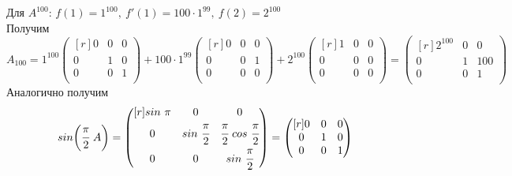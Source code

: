 \documentclass[12pt]{article}
\theoremstyle{definition}
\numberwithin{equation}{section}
\begin{document}
Для $A^{100}$: $f(1)=1^{100},~f'(1)=100\cdot 1^{99},~f(2)=2^{100}$\\
Получим
\[A_{100}=1^{100}\begin{pmatrix}[r]
0 & 0 & 0 \\
0 & 1 & 0 \\
0 & 0 & 1 \\
\end{pmatrix} + 100\cdot 1^{99}\begin{pmatrix}[r]
0 & 0 & 0 \\
0 & 0 & 1 \\
0 & 0 & 0 \\
\end{pmatrix} + 2^{100}\begin{pmatrix}[r]
1 & 0 & 0 \\
0 & 0 & 0 \\
0 & 0 & 0 \\
\end{pmatrix} = \begin{pmatrix}[r]
2^{100} & 0 & 0 \\
0 & 1 & 100 \\
0 & 0 & 1 \\
\end{pmatrix}\]
Аналогично получим
\[sin\bigg(\cfrac{\pi}{2}~A\bigg)=\begin{pmatrix}[r]
sin~\pi & 0 & 0 \\
0 & sin~\cfrac{\pi}{2} & \cfrac{\pi}{2}~cos~\cfrac{\pi}{2} \\
0 & 0 & sin~\cfrac{\pi}{2} \\
\end{pmatrix} = \begin{pmatrix}[r]
0 & 0 & 0 \\
0 & 1 & 0 \\
0 & 0 & 1 \\
\end{pmatrix}\]
\end{document}
